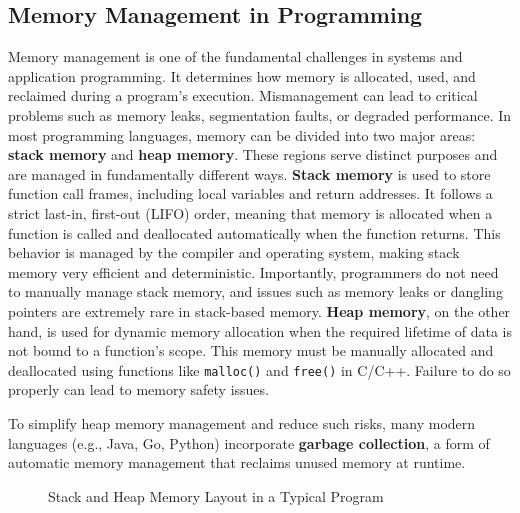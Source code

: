 \subsection{Memory Management in Programming}

Memory management is one of the fundamental challenges in systems and application programming. It determines how memory is allocated, used, and reclaimed during a program's execution. Mismanagement can lead to critical problems such as memory leaks, segmentation faults, or degraded performance. In most programming languages, memory can be divided into two major areas: \textbf{stack memory} and \textbf{heap memory}. These regions serve distinct purposes and are managed in fundamentally different ways. \textbf{Stack memory} is used to store function call frames, including local variables and return addresses. It follows a strict last-in, first-out (LIFO) order, meaning that memory is allocated when a function is called and deallocated automatically when the function returns. This behavior is managed by the compiler and operating system, making stack memory very efficient and deterministic. Importantly, programmers do not need to manually manage stack memory, and issues such as memory leaks or dangling pointers are extremely rare in stack-based memory. \textbf{Heap memory}, on the other hand, is used for dynamic memory allocation when the required lifetime of data is not bound to a function's scope. This memory must be manually allocated and deallocated using functions like \texttt{malloc()} and \texttt{free()} in C/C++. Failure to do so properly can lead to memory safety issues.

To simplify heap memory management and reduce such risks, many modern languages (e.g., Java, Go, Python) incorporate \textbf{garbage collection}, a form of automatic memory management that reclaims unused memory at runtime.

\begin{figure}[h]
\centering
{}
\caption{Stack and Heap Memory Layout in a Typical Program }
\end{figure}

